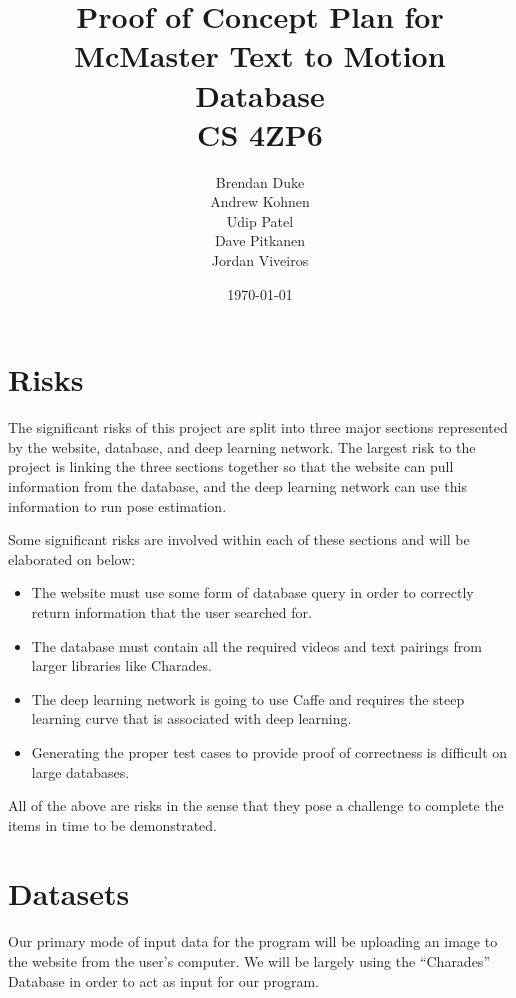 \documentclass[a4paper, 12pt]{article}
\date{\today}
\title{Proof of Concept Plan for McMaster Text to Motion Database \\CS 4ZP6}
\author{Brendan Duke\\
        Andrew Kohnen\\
        Udip Patel\\
        Dave Pitkanen\\
        Jordan Viveiros}
\begin{document}
\maketitle

\section{Risks}

The significant risks of this project are split into three major sections
represented by the website, database, and deep learning network. The largest
risk to the project is linking the three sections together so that the website
can pull information from the database, and the deep learning network can use
this information to run pose estimation.

Some significant risks are involved within each of these sections and will be elaborated on below:

\begin{itemize}
    \item The website must use some form of database query in order to
            correctly return information that the user searched for.
    \item The database must contain all the required videos and text pairings
            from larger libraries like Charades.
    \item The deep learning network is going to use Caffe and requires the
            steep learning curve that is associated with deep learning.
    \item Generating the proper test cases to provide proof of correctness is
            difficult on large databases.
\end{itemize}

All of the above are risks in the sense that they pose a challenge to complete
the items in time to be demonstrated.

\section{Datasets}
{Our primary mode of input data for the program will be uploading an image to
the website from the user's computer. We will be largely using the ``Charades''
Database in order to act as input for our program.}
\end{document}
